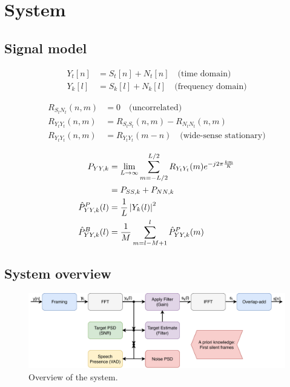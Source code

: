 \section{System} \label{sec:system}
\subsection{Signal model}

\begin{align}
  Y_{t}[n] &= S_{t}[n] + N_{t}[n] \quad \text{(time domain)}
  \label{eq:signal_time} \\
  Y_{k}[l] &= S_{k}[l] + N_{k}[l] \quad \text{(frequency domain)}
  \label{eq:signal_freq}
\end{align}

\begin{align}
  R_{S_{t}N_{t}}(n,m) &= 0 \quad \text{(uncorrelated)}
  \label{eq:signal_uncorrelated1} \\
  R_{Y_{t}Y_{t}}(n,m) &= R_{S_{t}S_{t}}(n,m) - R_{N_{t}N_{t}}(n,m)
  \label{eq:signal_uncorrelated2} \\
  R_{Y_{t}Y_{t}}(n,m) &= R_{Y_{t}Y_{t}}(m-n) \quad \text{(wide-sense stationary)}
  \label{eq:signal_wss}
\end{align}

\begin{align}
  P_{YY,k} &= \lim_{L \to \infty} \sum_{m=-L/2}^{L/2} R_{Y_{t}Y_{t}}(m) e^{-j2\pi \frac{km}{K}}
  \label{eq:pyyk1} \\
  &= P_{SS,k} + P_{NN,k}
  \label{eq:pyyk2} \\
  \hat P_{YY,k}^{P}(l) &= \frac{1}{L}\abs{Y_{k}(l)}^{2}
  \label{eq:pyyest} \\
  \hat P_{YY,k}^{B}(l) &= \frac{1}{M}\sum_{m=l-M+1}^{l} \hat P_{YY,k}^{P}(m)
  \label{eq:pyyBest}
\end{align}

\subsection{System overview}
\begin{figure}[h!]
  \includegraphics[width=\textwidth]{images/system.pdf}
  \caption{Overview of the system.}
  \label{fig:system}
\end{figure}
